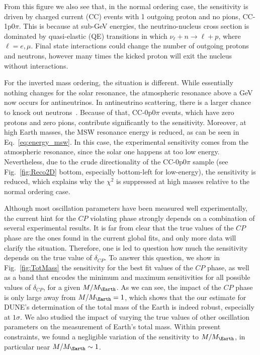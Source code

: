 From this figure we also see that, in the normal ordering case, the sensitivity is driven by charged current (CC) events with 1 outgoing proton and no pions, CC-1p0$\pi$.
This is because at sub-GeV energies, the neutrino-nucleus cross section is dominated by quasi-elastic (QE) transitions in which $\nu_\ell + n\to\ell+p$, where $\ell=e,\mu$.
Final state interactions could change the number of outgoing protons and neutrons, however many times the kicked proton will exit the nucleus without interactions.

For the inverted mass ordering, the situation is different.
While essentially nothing changes for the solar resonance, the atmospheric resonance above a GeV now occurs for antineutrinos. 
In antineutrino scattering, there is a larger chance to knock out neutrons~\cite{Palamara:2016uqu}.
Because of that, CC-0p0$\pi$ events, which have zero protons and zero pions, contribute significantly to the sensitivity.
Moreover, at high Earth masses, the MSW resonance energy is reduced, as can be seen in Eq.~\eqref{eq:energy_msw}.
In this case, the experimental sensitivity comes from the atmospheric resonance, since the solar one happens at too low energy.
Nevertheless, due to the crude directionality of the CC-0p0$\pi$ sample (see Fig.~\ref{fig:Reco2D} bottom, especially bottom-left for low-energy), the sensitivity is reduced, which explains why the $\chi^2$ is suppressed at high masses relative to the normal ordering case.

Although most oscillation parameters have been measured well experimentally, the current hint for the $CP$ violating phase strongly depends on a combination of several experimental results.
It is far from clear that the true values of the $CP$ phase are the ones found in the current global fits, and only more data will clarify the situation.
Therefore, one is led to question how much the sensitivity depends on the true value of $\delta_{CP}$.
To answer this question, we show in Fig.~\ref{fig:TotMass} the sensitivity for the best fit values of the $CP$ phase, as well as a band that encodes the minimum and maximum sensitivities for all possible values of $\delta_{CP}$, for a given $M/M_\Earth$.
As we can see, the impact of the $CP$ phase is only large away from $M/M_\Earth=1$, which shows that the our estimate for DUNE's determination of the total mass of the Earth is indeed robust, especially at $1\sigma$. 
We also studied the impact of varying the true values of other oscillation parameters on the measurement of Earth's total mass. 
Within present constraints, we found a negligible variation of the sensitivity to $M/M_\Earth$, in particular near $M/M_\Earth \sim 1$.

